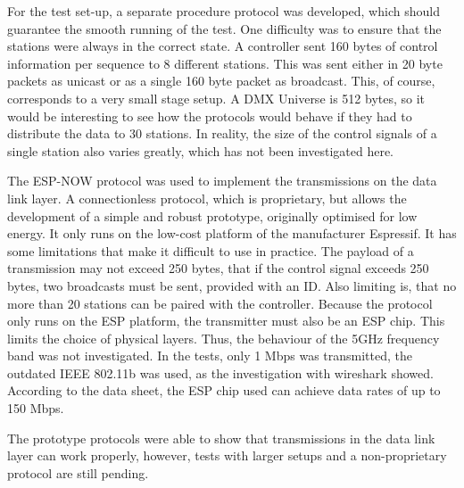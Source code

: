 For the test set-up, a separate procedure protocol was developed,
which should guarantee the smooth running of the test.
One difficulty was to ensure that the stations were always in the correct state.
A controller sent 160 bytes of control information per sequence to 8 different stations.
This was sent either in 20 byte packets as unicast or as a single 160 byte packet as broadcast.
This, of course, corresponds to a very small stage setup.
A DMX Universe is 512 bytes, so it would be interesting to see
how the protocols would behave if they had to distribute the data to 30 stations.
In reality, the size of the control signals of a single station also varies greatly,
which has not been investigated here.

The ESP-NOW protocol was used to implement the transmissions on the data link layer.
A connectionless protocol, which is proprietary, but allows the development of a simple and robust prototype,
originally optimised for low energy.
It only runs on the low-cost platform of the manufacturer Espressif.
It has some limitations that make it difficult to use in practice.
The payload of a transmission may not exceed 250 bytes, 
that if the control signal exceeds 250 bytes, two broadcasts must be sent, provided with an ID.
Also limiting is, that no more than 20 stations can be paired with the controller.
Because the protocol only runs on the ESP platform, the transmitter must also be an ESP chip.
This limits the choice of physical layers.
Thus, the behaviour of the 5GHz frequency band was not investigated.
In the tests, only 1 Mbps was transmitted, the outdated IEEE 802.11b was used,
as the investigation with wireshark showed.
According to the data sheet, the ESP chip used can achieve data rates of up to 150 Mbps.

The prototype protocols were able to show that transmissions in the data link layer can work properly,
however, tests with larger setups and a non-proprietary protocol are still pending.
